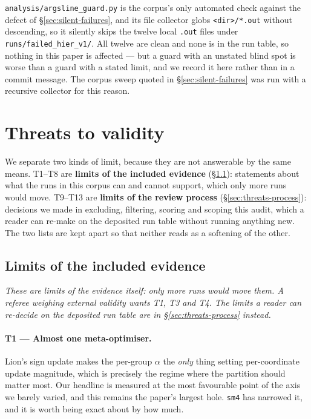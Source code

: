 \documentclass[10pt,letterpaper]{article}
\newcommand{\arm}[1]{\texttt{#1}}
\begin{document}
\texttt{analysis/argsline\_guard.py} is the corpus's only automated check against the defect of
\S\ref{sec:silent-failures}, and its file collector globs \texttt{<dir>/*.out} without descending,
so it silently skips the twelve local \texttt{.out} files under \texttt{runs/failed\_hier\_v1/}.
All twelve are clean and none is in the run table, so nothing in this paper is affected --- but a
guard with an unstated blind spot is worse than a guard with a stated limit, and we record it here
rather than in a commit message. The corpus sweep quoted in \S\ref{sec:silent-failures} was run
with a recursive collector for this reason.

\section{Threats to validity}
\label{sec:threats}

We separate two kinds of limit, because they are not answerable by the same means. T1--T8 are
\textbf{limits of the included evidence} (\S\ref{sec:threats-evidence}): statements about what the runs in this corpus can and
cannot support, which only more runs would move. T9--T13 are \textbf{limits of the review process}
(\S\ref{sec:threats-process}):
decisions we made in excluding, filtering, scoring and scoping this audit, which a reader can
re-make on the deposited run table without running anything new. The two lists are kept apart so
that neither reads as a softening of the other.

\subsection{Limits of the included evidence}
\label{sec:threats-evidence}

\emph{These are limits of the evidence itself: only more runs would move them. A referee weighing
external validity wants T1, T3 and T4. The limits a reader can re-decide on the deposited run
table are in \S\ref{sec:threats-process} instead.}

\paragraph{T1 --- Almost one meta-optimiser.}
Lion's sign update makes the per-group $\alpha$ the
\emph{only} thing setting per-coordinate update magnitude, which is precisely the regime where the
partition should matter most. Our headline is measured at the most favourable point of the axis
we barely varied, and this remains the paper's largest hole. \arm{sm4} has narrowed it, and it is
worth being exact about by how much.
\end{document}
